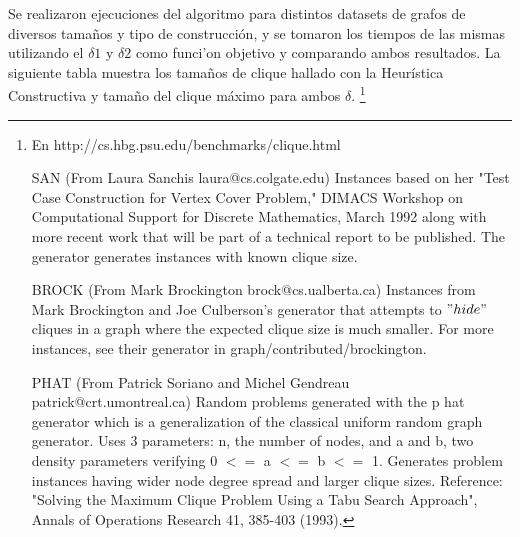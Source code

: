 Se realizaron ejecuciones del algoritmo para distintos datasets de grafos de diversos tamaños y tipo de construcción, y se tomaron los tiempos de las mismas utilizando el $\delta1$ y $\delta2$ como funci'on objetivo y comparando ambos resultados.
La siguiente tabla muestra los tamaños de clique hallado con la Heurística Constructiva y tamaño del clique máximo para ambos $\delta$.
\footnote{
En http://cs.hbg.psu.edu/benchmarks/clique.html	

SAN (From Laura Sanchis laura@cs.colgate.edu) Instances based on her "Test Case Construction for Vertex Cover Problem," DIMACS Workshop on Computational Support for Discrete Mathematics, March 1992 along with more recent work that will be part of a technical report to be published. The generator generates instances with known clique size.

BROCK (From Mark Brockington brock@cs.ualberta.ca) Instances from Mark Brockington and Joe Culberson's generator that attempts to $"hide"$ cliques in a graph where the expected clique size is much smaller. For more instances, see their generator in graph/contributed/brockington.

PHAT (From Patrick Soriano and Michel Gendreau patrick@crt.umontreal.ca) Random problems generated with the p hat generator which is a generalization of the classical uniform random graph generator. Uses 3 parameters: n, the number of nodes, and a and b, two density parameters verifying 0 $<=$ a $<=$ b $<=$ 1. Generates problem instances having wider node degree spread and larger clique sizes. Reference: "Solving the Maximum Clique Problem Using a Tabu Search Approach", Annals of Operations Research 41, 385-403 (1993).
}

